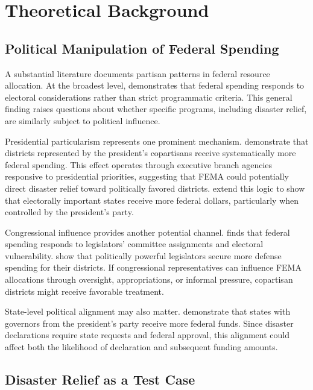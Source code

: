 \documentclass[12pt,letterpaper,oneside]{book}
\begin{document}
\section{Theoretical Background}\label{sec:theory}

\subsection{Political Manipulation of Federal Spending}

A substantial literature documents partisan patterns in federal resource allocation. At the broadest level, \cite{levitt1997impact} demonstrates that federal spending responds to electoral considerations rather than strict programmatic criteria. This general finding raises questions about whether specific programs, including disaster relief, are similarly subject to political influence.

Presidential particularism represents one prominent mechanism. \cite{berry2010presidents} demonstrate that districts represented by the president's copartisans receive systematically more federal spending. This effect operates through executive branch agencies responsive to presidential priorities, suggesting that FEMA could potentially direct disaster relief toward politically favored districts. \cite{kriner2015particularistic} extend this logic to show that electorally important states receive more federal dollars, particularly when controlled by the president's party.

Congressional influence provides another potential channel. \cite{levitt1997impact} finds that federal spending responds to legislators' committee assignments and electoral vulnerability. \cite{berry2010presidents} show that politically powerful legislators secure more defense spending for their districts. If congressional representatives can influence FEMA allocations through oversight, appropriations, or informal pressure, copartisan districts might receive favorable treatment.

State-level political alignment may also matter. \cite{larcinese2006allocating} demonstrate that states with governors from the president's party receive more federal funds. Since disaster declarations require state requests and federal approval, this alignment could affect both the likelihood of declaration and subsequent funding amounts.

\subsection{Disaster Relief as a Test Case}
\end{document}
